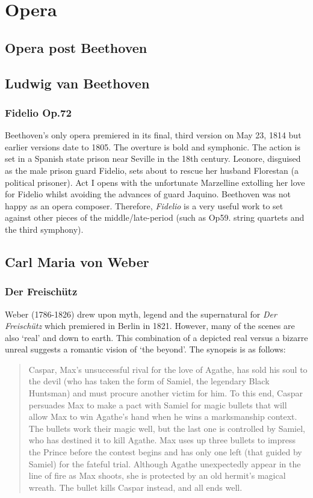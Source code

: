 
\chapter{Opera}
\label{opera}

\section{Opera post Beethoven}


\section{Ludwig van Beethoven}
\subsection{Fidelio Op.72}
Beethoven's only opera premiered in its final, third version on May 23, 1814 but earlier versions date to 1805.  The overture is bold and symphonic. The action is set in a Spanish state prison near Seville in the 18th century. Leonore, disguised as the male prison guard Fidelio, sets about to rescue her husband Florestan (a political prisoner). Act I opens with the unfortunate Marzelline extolling her love for Fidelio whilst avoiding the advances of guard Jaquino. Beethoven was not happy as an opera composer. Therefore, \textit{Fidelio} is a very useful work to set against other pieces of the middle/late-period (such as Op59. string quartets and the third symphony).    

\section{Carl Maria von Weber}
\subsection{Der Freisch\"utz} 
Weber (1786-1826) drew upon myth, legend and the supernatural for \textit{Der Freisch\"utz} which premiered in Berlin in 1821. However, many of the scenes are also `real' and down to earth. This combination of a depicted real versus a bizarre unreal suggests a romantic vision of `the beyond'. The synopsis is as follows:

\begin{quotation}
Caspar, Max's unsuccessful rival for the love of Agathe, has sold his soul to the devil (who has taken the form of Samiel, the legendary Black Huntsman) and must procure another victim for him. To this end, Caspar persuades Max to make a pact with Samiel for magic bullets that will allow Max to win Agathe's hand when he wins a marksmanship context. The bullets work their magic well, but the last one is controlled by Samiel, who has destined it to kill Agathe. Max uses up three bullets to impress the Prince before the contest begins and has only one left (that guided by Samiel) for the fateful trial. Although Agathe unexpectedly appear in the line of fire as Max shoots, she is protected by an old hermit's magical wreath. The bullet kills Caspar instead, and all ends well. \citep[p640]{grout1996history} 
\end{quotation}

